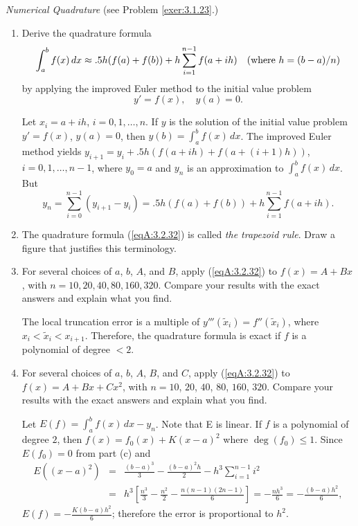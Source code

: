 \documentclass{ximera}
\begin{document}
\begin{problem}\label{exer:3.2.32}
\emph{Numerical Quadrature} (see Problem \ref{exer:3.1.23}.)
\begin{enumerate}
\item %
Derive the quadrature formula
\begin{equation}\label{eqA:3.2.32}
\int_a^bf(x)\,dx\approx .5h(f(a)+f(b))+
h\sum_{i=1}^{n-1}f(a+ih)\mbox{\quad(where } h=(b-a)/n)
\end{equation}
by applying the improved Euler method to the initial value problem
$$
y'=f(x),\quad y(a)=0.
$$

\begin{solution}
    Let $x_i=a+ih$, $i=0,1,\dots,n$. If $y$ is the solution of the initial
value problem $y'=f(x)$, $y(a)=0$, then $y(b)=\int_a^bf(x)\,dx$.
The improved  Euler method yields
$y_{i+1}=y_i+.5h\left(f(a+ih)+f(a+(i+1)h)\right)$,
$i=0,1,\dots,n-1$,
where $y_0=a$ and $y_n$ is an approximation to $\int_a^bf(x)\,dx$.
But
$$
y_n=\sum_{i=0}^{n-1}(y_{i+1}-y_i) =.5h\left(f(a)+f(b)\right)
+h\sum_{i=1}^{n-1}f(a+ih).
$$
\end{solution}
\item %
The quadrature formula (\ref{eqA:3.2.32}) is  called \emph{the trapezoid rule}. Draw a figure that justifies this terminology.
\item %
For several choices of $a$, $b$, $A$,  and $B$,
 apply (\ref{eqA:3.2.32}) to $f(x)=A+Bx$, with $n = 10,20,40,80,160,320$.
Compare your results with the exact answers
and explain what you find.

\begin{solution}
    The local truncation error is a multiple of
$y'''(\tilde x_i)=f''(\tilde x_i)$, where $x_i<\tilde
x_i<x_{i+1}$. Therefore, the quadrature formula is exact
if $f$ is a polynomial of degree  $<2$.
\end{solution}
\item %
For several choices of $a$, $b$, $A$, $B$, and $C$,
 apply (\ref{eqA:3.2.32}) to $f(x)=A+Bx+Cx^2$, with $n=10$, $20$, $40$, $80$, $160$,
$320$.
 Compare your results with the exact answers
and explain what you find.

\begin{solution}
    Let
$E(f)=\int_a^bf(x)\,dx-y_n$.  Note that E is linear.
If $f$ is a polynomial of degree $2$, then $f(x)=f_0(x)+K(x-a)^2$
where $\deg(f_0)\le1$. Since
$E(f_0)=0$ from part (c) and
\begin{eqnarray*}
E((x-a)^2)&=&\frac{(b-a)^3}{3}-\frac{(b-a)^2h}{2}-h^3\sum_{i=1}^{n-1}i^2\\
&=&h^3\left[\frac{n^3}{3}-\frac{n^2}{2}-\frac{n(n-1)(2n-1)}{6}\right]
=-\frac{nh^3}{6}=-\frac{(b-a)h^2}{6},
\end{eqnarray*}
$E(f)=-\frac{K(b-a)h^2}{6}$; therefore the error is proportional
to  $h^2$.
\end{solution}
\end{enumerate}
\end{problem}
\end{document}
